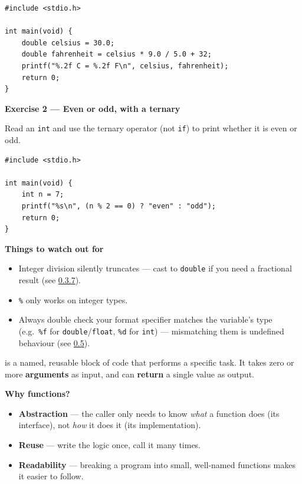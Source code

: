 \documentclass[11pt,a4paper]{article}
\providecommand{\tightlist}{\setlength{\itemsep}{0pt}\setlength{\parskip}{0pt}}
\begin{document}
\begin{lstlisting}[style=cscode]
#include <stdio.h>

int main(void) {
    double celsius = 30.0;
    double fahrenheit = celsius * 9.0 / 5.0 + 32;
    printf("%.2f C = %.2f F\n", celsius, fahrenheit);
    return 0;
}
\end{lstlisting}

\textbf{Exercise 2 --- Even or odd, with a ternary}

Read an \texttt{int} and use the ternary operator (not \texttt{if}) to print whether it is even or odd.

\begin{lstlisting}[style=cscode]
#include <stdio.h>

int main(void) {
    int n = 7;
    printf("%s\n", (n % 2 == 0) ? "even" : "odd");
    return 0;
}
\end{lstlisting}

\textbf{Things to watch out for}

\begin{itemize}
\tightlist
\item
  Integer division silently truncates --- cast to \texttt{double} if you need a fractional result (see \protect\hyperlink{037-division-with-double}{0.3.7}).
\item
  \texttt{\%} only works on integer types.
\item
  Always double check your format specifier matches the variable's type (e.g.~\texttt{\%f} for \texttt{double}/\texttt{float}, \texttt{\%d} for \texttt{int}) --- mismatching them is undefined behaviour (see \protect\hyperlink{05-undefined-behaviour}{0.5}).
\end{itemize}

\label{l1-conditionals-and-functions}
\hypertarget{l1-conditionals-and-functions}{}

\label{11-abstraction-i-functions}
\hypertarget{11-abstraction-i-functions}{}

\begin{description}
\tightlist
\item[\emph{Function}]
is a named, reusable block of code that performs a specific task. It takes zero or more \textbf{arguments} as input, and can \textbf{return} a single value as output.
\end{description}

\textbf{Why functions?}

\begin{itemize}
\tightlist
\item
  \textbf{Abstraction} --- the caller only needs to know \emph{what} a function does (its interface), not \emph{how} it does it (its implementation).
\item
  \textbf{Reuse} --- write the logic once, call it many times.
\item
  \textbf{Readability} --- breaking a program into small, well-named functions makes it easier to follow.
\end{itemize}
\end{document}
